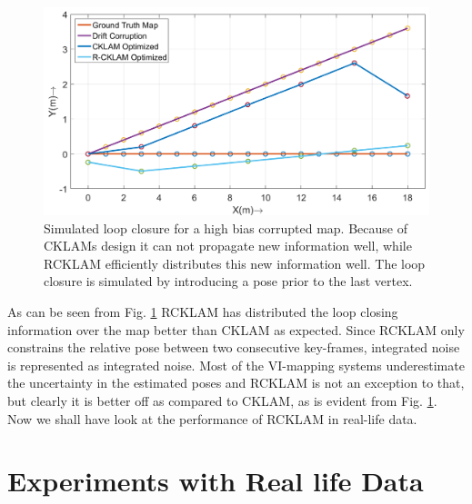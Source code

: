 \begin{figure}[ht]
  \centering
    \includegraphics[width=1.00\textwidth]{images/Syn16_map_loppClosureSym.png}
  \caption{Simulated loop closure for a high bias corrupted map. Because of CKLAMs design it can not propagate new information well, while RCKLAM efficiently distributes this new information well. The loop closure is simulated by introducing a pose prior to the last vertex.}
  \label{fig:Syn16MapLoppClosureSym}
\end{figure}

As can be seen from Fig. \ref{fig:Syn16MapLoppClosureSym} RCKLAM has distributed the loop closing information over the map better than CKLAM as expected. Since RCKLAM only constrains the relative pose between two consecutive key-frames, integrated noise is represented as integrated noise. Most of the VI-mapping systems underestimate the uncertainty in the estimated poses and RCKLAM is not an exception to that, but clearly it is better off as compared to CKLAM, as is evident from Fig. \ref{fig:Syn16MapLoppClosureSym}. Now we shall have look at the performance of RCKLAM in real-life data.

\section{Experiments with Real life Data}
\label{sec:RealLifeExpt}

